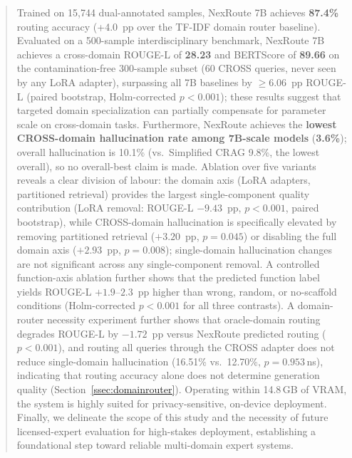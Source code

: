 \documentclass[a4paper,fleql]{cas-sc}
\begin{document}
\begin{abstract}
Trained on 15,744 dual-annotated samples, NexRoute 7B achieves \textbf{87.4\%} routing accuracy (+4.0~pp over the TF-IDF domain router baseline). Evaluated on a 500-sample interdisciplinary benchmark, NexRoute 7B achieves a cross-domain ROUGE-L of \textbf{28.23} and BERTScore of \textbf{89.66} on the contamination-free 300-sample subset (60 CROSS queries, never seen by any LoRA adapter), surpassing all 7B baselines by ${\geq}6.06$~pp ROUGE-L (paired bootstrap, Holm-corrected $p{<}0.001$); these results suggest that targeted domain specialization can partially compensate for parameter scale on cross-domain tasks. Furthermore, NexRoute achieves the \textbf{lowest CROSS-domain hallucination rate among 7B-scale models} (\textbf{3.6\%}); overall hallucination is 10.1\% (vs.\ Simplified CRAG 9.8\%, the lowest overall), so no overall-best claim is made. Ablation over five variants reveals a clear division of labour: the domain axis (LoRA adapters, partitioned retrieval) provides the largest single-component quality contribution (LoRA removal: ROUGE-L $-9.43$~pp, $p{<}0.001$, paired bootstrap), while CROSS-domain hallucination is specifically elevated by removing partitioned retrieval ($+3.20$~pp, $p{=}0.045$) or disabling the full domain axis ($+2.93$~pp, $p{=}0.008$); single-domain hallucination changes are not significant across any single-component removal. A controlled function-axis ablation further shows that the predicted function label yields ROUGE-L $+1.9$--$2.3$~pp higher than wrong, random, or no-scaffold conditions (Holm-corrected $p{<}0.001$ for all three contrasts). A domain-router necessity experiment further shows that oracle-domain routing degrades ROUGE-L by $-1.72$~pp versus NexRoute predicted routing ($p{<}0.001$), and routing all queries through the CROSS adapter does not reduce single-domain hallucination (16.51\% vs.\ 12.70\%, $p{=}0.953$\,\textsf{ns}), indicating that routing accuracy alone does not determine generation quality (Section~\ref{ssec:domainrouter}). Operating within 14.8\,GB of VRAM, the system is highly suited for privacy-sensitive, on-device deployment. Finally, we delineate the scope of this study and the necessity of future licensed-expert evaluation for high-stakes deployment, establishing a foundational step toward reliable multi-domain expert systems.
\end{abstract}
\end{document}
